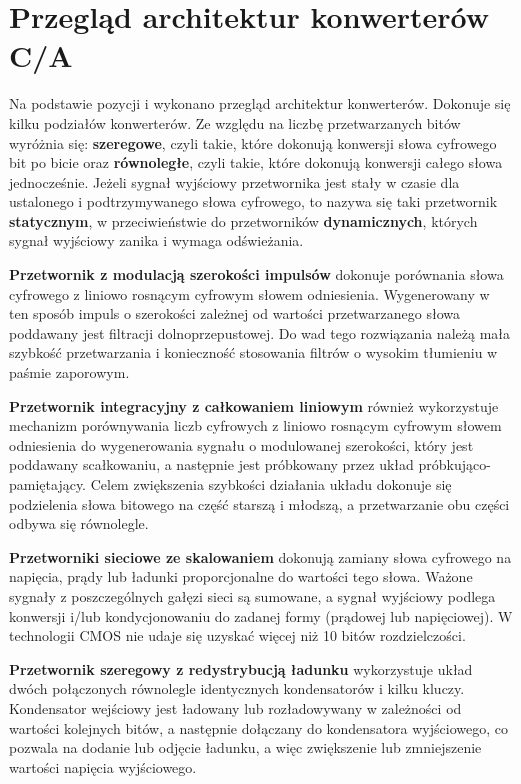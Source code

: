\documentclass[10pt,a4paper,twoside]{report}
\theoremstyle{definition}
\theoremstyle{definition}
\theoremstyle{definition}
\theoremstyle{definition}
\theoremstyle{definition}
\begin{document}
	
	\section{Przegląd architektur konwerterów C/A }
	{	Na podstawie pozycji \cite{cmosanal} i \cite{plassche} wykonano przegląd architektur konwerterów. Dokonuje się kilku podziałów konwerterów. Ze względu na liczbę przetwarzanych bitów wyróżnia się: \textbf{szeregowe}, czyli takie, które dokonują konwersji słowa cyfrowego bit po bicie oraz \textbf{równoległe}, czyli takie, które dokonują konwersji całego słowa jednocześnie. Jeżeli sygnał wyjściowy przetwornika jest stały w czasie dla ustalonego i podtrzymywanego słowa cyfrowego, to nazywa się taki przetwornik \textbf{statycznym}, w przeciwieństwie do przetworników \textbf{dynamicznych}, których sygnał wyjściowy zanika i wymaga odświeżania. }
	
	{	\textbf{Przetwornik z modulacją szerokości impulsów} dokonuje porównania słowa cyfrowego z liniowo rosnącym cyfrowym słowem odniesienia. Wygenerowany w ten sposób impuls o szerokości zależnej od wartości przetwarzanego słowa poddawany jest filtracji dolnoprzepustowej. Do wad tego rozwiązania należą mała szybkość przetwarzania i konieczność stosowania filtrów o wysokim tłumieniu w paśmie zaporowym. }
	
	{	\textbf{Przetwornik integracyjny z całkowaniem liniowym} również wykorzystuje mechanizm porównywania liczb cyfrowych z liniowo rosnącym cyfrowym słowem odniesienia do wygenerowania sygnału o modulowanej szerokości, który jest poddawany scałkowaniu, a następnie jest próbkowany przez układ próbkująco-pamiętający. Celem zwiększenia szybkości działania układu dokonuje się podzielenia słowa bitowego na część starszą i młodszą, a przetwarzanie obu części odbywa się równolegle. }
	
	{	\textbf{Przetworniki sieciowe ze skalowaniem} dokonują zamiany słowa cyfrowego na napięcia, prądy lub ładunki proporcjonalne do wartości tego słowa. Ważone sygnały z poszczególnych gałęzi sieci są sumowane, a sygnał wyjściowy podlega konwersji i/lub kondycjonowaniu do zadanej formy (prądowej lub napięciowej). W technologii CMOS nie udaje się uzyskać więcej niż 10 bitów rozdzielczości.}
	
	{	\textbf{Przetwornik szeregowy z redystrybucją ładunku} wykorzystuje układ dwóch połączonych równolegle identycznych kondensatorów i kilku kluczy. Kondensator wejściowy jest ładowany lub rozładowywany w zależności od wartości kolejnych bitów, a następnie dołączany do kondensatora wyjściowego, co pozwala na dodanie lub odjęcie ładunku, a więc zwiększenie lub zmniejszenie wartości napięcia wyjściowego.
	}
	
\end{document}
